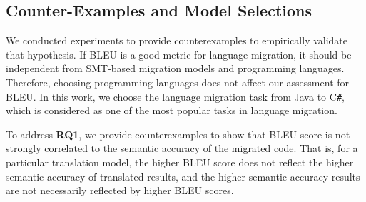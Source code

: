\subsection{Counter-Examples and Model Selections}

 

We conducted experiments to provide counterexamples to empirically
validate that hypothesis. If BLEU is a good metric for language
migration, it should be independent from SMT-based migration models
and programming languages. Therefore, choosing programming languages
does not affect our assessment for BLEU. In this work, we choose the
language migration task from Java to C\texttt{\#}, which is considered
as one of the most popular tasks in language migration.

%
%
To address {\bf RQ1}, we provide counterexamples to show that BLEU
score is not strongly correlated to the semantic accuracy of the
migrated code. That is, for a particular translation model, the higher
BLEU score does not reflect the higher semantic accuracy of translated
results, and the higher semantic accuracy results are not 
necessarily reflected by higher BLEU scores.
%
%
%

